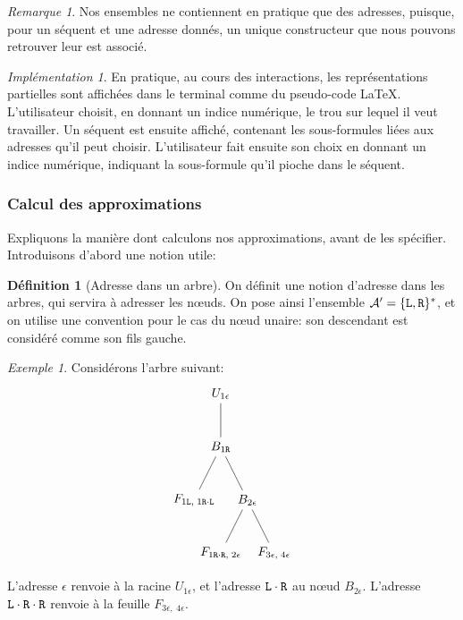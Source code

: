 \documentclass[11pt,a4paper]{article}
\theoremstyle{plain}
\theoremstyle{definition}
\newtheorem{definition}{Définition}
\theoremstyle{remark}
\newtheorem{remark}{Remarque}
\newtheorem{example}{Exemple}
\newtheorem{implementation}{Implémentation}
\newcommand*{\Left}{\textnormal{\texttt{L}}}
\newcommand*{\Right}{\textnormal{\texttt{R}}}
\begin{document}
\begin{remark}
    Nos ensembles ne contiennent en pratique que des adresses, puisque, pour un séquent et une adresse donnés, un unique constructeur que nous pouvons retrouver leur est associé. 
\end{remark}

\begin{implementation}
    En pratique, au cours des interactions, les représentations partielles sont affichées dans le terminal comme du pseudo-code \LaTeX. L'utilisateur choisit, en donnant un indice numérique, le trou sur lequel il veut travailler. Un séquent est ensuite affiché, contenant les sous-formules liées aux adresses qu'il peut choisir. L'utilisateur fait ensuite son choix en donnant un indice numérique, indiquant la sous-formule qu'il pioche dans le séquent.
\end{implementation}

\subsubsection{Calcul des approximations}

Expliquons la manière dont calculons nos approximations, avant de les spécifier. Introduisons d'abord une notion utile:

\begin{definition}[Adresse dans un arbre]
    On définit une notion d'adresse dans les arbres, qui servira à adresser les n\oe uds. On pose ainsi l'ensemble $\mathcal{A'} = \{ \Left, \Right\}^{*}$, et on utilise une convention pour le cas du n\oe ud unaire: son descendant est considéré comme son fils gauche.
\end{definition}

\begin{example} Considérons l'arbre suivant:
    \begin{equation*}
        \begin{tikzpicture}%
        [level distance=1.5cm,
        level 2/.style={sibling distance=5cm}
        level 3/.style={sibling distance=10cm}]
        \node {$U_{1 \epsilon}$}
        child {node {$B_{1 \Right}$}
            child {node {$F_{1 \Left, \; 1 \Right \cdot \Left}$}}
            child {
                node {$B_{2 \epsilon}$}
                child {node {$F_{1 \Right \cdot \Right, \; 2 \epsilon}$}}
                child {node {$F_{3 \epsilon, \; 4 \epsilon}$}}
        }};
        \end{tikzpicture}
    \end{equation*}

    L'adresse $\epsilon$ renvoie à la racine $U_{1 \epsilon}$, et l'adresse $\Left \cdot \Right$ au n\oe ud $B_{2 \epsilon}$. L'adresse $\Left \cdot \Right \cdot \Right$ renvoie à la feuille $F_{3 \epsilon, \; 4 \epsilon}$.
\end{example}
\end{document}

